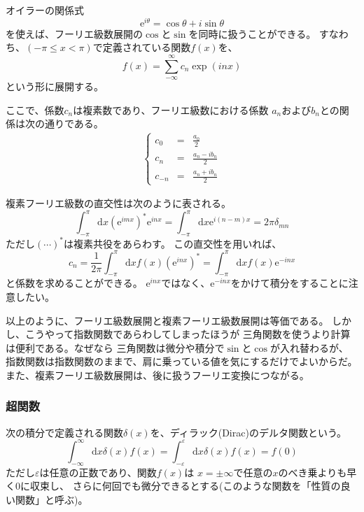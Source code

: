 \documentclass{jarticle}
\newcommand{\diff}{\mathrm d}
\newcommand{\e}{\mathrm e}
\begin{document}
オイラーの関係式
\begin{equation}
  \e^{i\theta} = \cos \theta + i \sin \theta
\end{equation}
を使えば、フーリエ級数展開の$\cos$と$\sin$を同時に扱うことができる。
すなわち、$(-\pi \le x < \pi)$で定義されている関数$f(x)$を、
$$
  f(x) = \sum_{-\infty}^{\infty} c_n \exp{(inx)}
$$
という形に展開する。

ここで、係数$c_n$は複素数であり、フーリエ級数における係数
$a_n$および$b_n$との関係は次の通りである。
\begin{eqnarray}
  \left\{
  \begin{array}{ccc}
    c_0    & = & \displaystyle\frac{a_0}{2}         \\
    c_n    & = & \displaystyle\frac{a_n - i b_n}{2} \\
    c_{-n} & = & \displaystyle\frac{a_n + i b_n}{2}
  \end{array}
  \right.
  \label{eq_fourier_prefoctor}
\end{eqnarray}

複素フーリエ級数の直交性は次のように表される。
\begin{equation}
  \int_{-\pi}^{\pi} \diff x (\e^{imx})^* \e^{inx} =
  \int_{-\pi}^{\pi} \diff x \e^{i(n-m)x} = 2\pi \delta_{mn}
\end{equation}
ただし$(\cdots)^*$は複素共役をあらわす。
この直交性を用いれば、
\begin{equation}
  c_n = \frac{1}{2\pi} \int_{-\pi}^{\pi} \diff x  f(x) (\e^{inx})^*
  = \int_{-\pi}^{\pi} \diff x  f(x) \e^{-inx}
\end{equation}
と係数を求めることができる。
$\e^{inx}$ではなく、$\e^{-inx}$をかけて積分をすることに注意したい。

以上のように、フーリエ級数展開と複素フーリエ級数展開は等価である。
しかし、こうやって指数関数であらわしてしまったほうが
三角関数を使うより計算は便利である。なぜなら
三角関数は微分や積分で$\sin$と$\cos$が入れ替わるが、
指数関数は指数関数のままで、肩に乗っている値を気にするだけでよいからだ。
また、複素フーリエ級数展開は、後に扱うフーリエ変換につながる。


\subsubsection{超関数}

次の積分で定義される関数$\delta(x)$を、ディラック(Dirac)のデルタ関数という。
$$
  \int_{-\infty}^{\infty} \!\!\! \diff x \delta(x) f(x) =
  \int_{-\varepsilon}^{\varepsilon} \!\!\! \diff x \delta(x) f(x) =
  f(0)
$$
ただし$\varepsilon$は任意の正数であり、関数$f(x)$は
$x = \pm \infty$で任意の$x$のべき乗よりも早く$0$に収束し、
さらに何回でも微分できるとする(このような関数を「性質の良い関数」と呼ぶ)。
\end{document}
